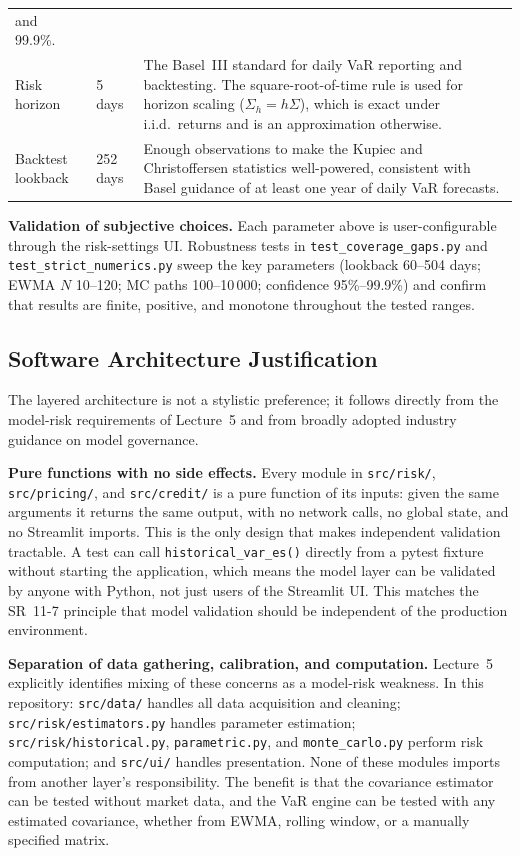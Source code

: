 \documentclass[11pt]{article}
\newcommand{\code}[1]{\texttt{#1}}
\begin{document}
\begin{center}
\begin{tabular}{L{3.0cm}L{1.8cm}L{8.0cm}}
    and 99.9\%. \\[4pt]
Risk horizon
  & 5 days
  & The Basel~III standard for daily VaR reporting and backtesting.
    The square-root-of-time rule is used for horizon scaling
    ($\Sigma_h = h\Sigma$), which is exact under i.i.d.\ returns and is
    an approximation otherwise. \\[4pt]
Backtest lookback
  & 252 days
  & Enough observations to make the Kupiec and Christoffersen statistics
    well-powered, consistent with Basel guidance of at least one year of
    daily VaR forecasts. \\
\bottomrule
\end{tabular}
\end{center}

\textbf{Validation of subjective choices.}  Each parameter above is
user-configurable through the risk-settings UI.  Robustness tests in \code{test\_coverage\_gaps.py} and
\code{test\_strict\_numerics.py} sweep the key parameters (lookback 60--504 days; EWMA $N$ 10--120;
MC paths 100--10\,000; confidence 95\%--99.9\%) and confirm that results
are finite, positive, and monotone throughout the tested ranges.

\subsection{Software Architecture Justification}
\label{sec:arch-justification}

The layered architecture is not a stylistic preference; it follows
directly from the model-risk requirements of Lecture~5 and from broadly
adopted industry guidance on model governance.

\textbf{Pure functions with no side effects.}  Every module in
\code{src/risk/}, \code{src/pricing/}, and \code{src/credit/} is a pure
function of its inputs: given the same arguments it returns the same
output, with no network calls, no global state, and no Streamlit imports.
This is the only design that makes independent validation tractable.
A test can call \code{historical\_var\_es()} directly from a pytest fixture
without starting the application, which means the model layer can be
validated by anyone with Python, not just users of the Streamlit UI.
This matches the SR~11-7 principle that model validation should be
independent of the production environment.

\textbf{Separation of data gathering, calibration, and computation.}
Lecture~5 explicitly identifies mixing of these concerns as a model-risk
weakness.  In this repository: \code{src/data/} handles all data
acquisition and cleaning; \code{src/risk/estimators.py} handles parameter
estimation; \code{src/risk/historical.py}, \code{parametric.py}, and
\code{monte\_carlo.py} perform risk computation; and \code{src/ui/} handles
presentation.  None of these modules imports from another layer's
responsibility.  The benefit is that the covariance estimator can be
tested without market data, and the VaR engine can be tested with any
estimated covariance, whether from EWMA, rolling window, or a manually
specified matrix.
\end{document}

